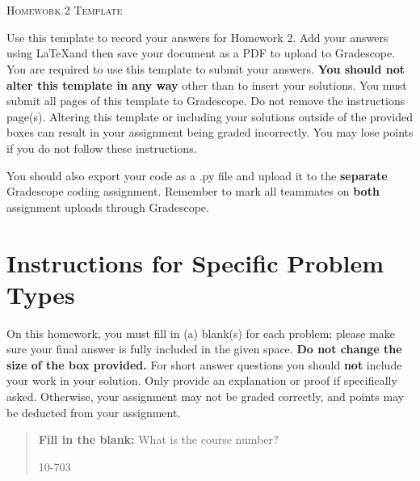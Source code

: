 \documentclass[12pt]{article}
\begin{document}
\section*{}
\begin{center}
  \centerline{\textsc{\LARGE  Homework 2 Template}}
\end{center}

Use this template to record your answers for Homework 2.  Add your answers using \LaTeX and then save your document as a PDF to upload to Gradescope.  You are required to use this template to submit your answers.  \textbf{You should not alter this template in any way} other than to insert your solutions.  You must submit all \pageref{LastPage} pages of this template to Gradescope.  Do not remove the instructions page(s).  Altering this template or including your solutions outside of the provided boxes can result in your assignment being graded incorrectly.  You may lose points if you do not follow these instructions.

You should also export your code as a .py file and upload it to the \textbf{separate} Gradescope coding assignment. Remember to mark all teammates on \textbf{both} assignment uploads through Gradescope.

\section*{Instructions for Specific Problem Types}

On this homework, you must fill in (a) blank(s) for each problem; please make sure your final answer is fully included in the given space.  \textbf{Do not change the size of the box provided.}  For short answer questions you should \textbf{not} include your work in your solution.  Only provide an explanation or proof if specifically asked.  Otherwise, your assignment may not be graded correctly, and points may be deducted from your assignment.

\begin{quote}
\textbf{Fill in the blank:} What is the course number?

\begin{tcolorbox}[fit,height=1cm, width=4cm, blank, borderline={1pt}{-2pt},valign=center,nobeforeafter]
    \begin{center}\huge10-703\end{center}
    \end{tcolorbox}
\end{quote}

\newpage
\end{document}

